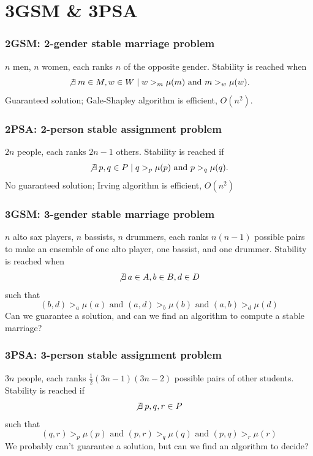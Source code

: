 \documentclass[mathserif,serif]{beamer}
\begin{document}
\frame{\titlepage}

\begin{frame}
	\tableofcontents
\end{frame}


\section{3GSM \& 3PSA}

\begin{frame}
	\frametitle{2GSM: 2-gender stable marriage problem}

	$n$ men, $n$ women, each ranks $n$ of the opposite gender.
	Stability is reached when
	\[
	\not\exists \: m \in M, w \in W \mid w >_m \mu(m) \text{ and } m >_w \mu(w).
	\]
	Guaranteed solution;
	Gale-Shapley algorithm is efficient, $O(n^2)$.
\end{frame}

\begin{frame}
	\frametitle{2PSA: 2-person stable assignment problem}

	$2n$ people, each ranks $2n-1$ others.
	Stability is reached if
	\[
	\not\exists \: p, q \in P \mid q >_p \mu(p) \text{ and } p >_q \mu(q).
	\]
	No guaranteed solution;
	Irving algorithm is efficient, $O(n^2)$
\end{frame}

\begin{frame}
	\frametitle{3GSM: 3-gender stable marriage problem}

	$n$ alto sax players, $n$ bassists, $n$ drummers, each ranks $n(n-1)$ possible pairs to make an ensemble of one
	alto player, one bassist, and one drummer.
	Stability is reached when
	\[
	\not\exists \: a \in A, b \in B, d \in D
	\]
	such that
	\[
	(b,d) >_a \mu(a) \text{ and } (a,d) >_b \mu(b) \text{ and } (a,b) >_d \mu(d)
	\]
	Can we guarantee a solution, and can we find an algorithm to compute a stable marriage?
\end{frame}

\begin{frame}
	\frametitle{3PSA: 3-person stable assignment problem}

	$3n$ people, each ranks $\frac{1}{2}(3n-1)(3n-2)$ possible pairs of other students.
	Stability is reached if
	\[
	\not\exists \: p, q, r \in P
	\]
	such that
	\[
	(q,r) >_p \mu(p) \text{ and } (p,r) >_q \mu(q) \text{ and } (p,q) >_r \mu(r)
	\]
	We probably can't guarantee a solution, but can we find an algorithm to decide?
\end{frame}
\end{document}
